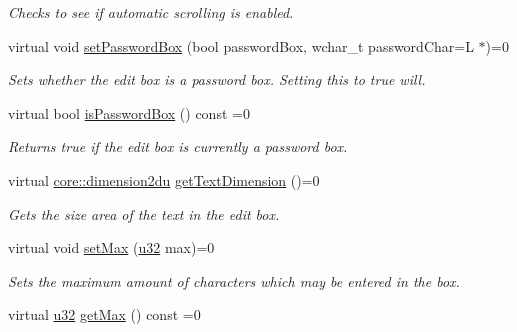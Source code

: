 \begin{DoxyCompactItemize}
\begin{DoxyCompactList}\small\item\em Checks to see if automatic scrolling is enabled. \end{DoxyCompactList}\item 
virtual void \hyperlink{classirr_1_1gui_1_1IGUIEditBox_a755baeca9941267fe11b0c0598b772bf}{set\+Password\+Box} (bool password\+Box, wchar\+\_\+t password\+Char=L\textquotesingle{} $\ast$\textquotesingle{})=0
\begin{DoxyCompactList}\small\item\em Sets whether the edit box is a password box. Setting this to true will. \end{DoxyCompactList}\item 
\mbox{\label{classirr_1_1gui_1_1IGUIEditBox_a94b093df77af7cf3e3f9853d68d2c8f2}} 
virtual bool \hyperlink{classirr_1_1gui_1_1IGUIEditBox_a94b093df77af7cf3e3f9853d68d2c8f2}{is\+Password\+Box} () const =0
\begin{DoxyCompactList}\small\item\em Returns true if the edit box is currently a password box. \end{DoxyCompactList}\item 
virtual \hyperlink{namespaceirr_1_1core_a13e5bd7e47b2014eefc870ede11bbbbc}{core\+::dimension2du} \hyperlink{classirr_1_1gui_1_1IGUIEditBox_ac993c4647168460c68d56527ba213b9c}{get\+Text\+Dimension} ()=0
\begin{DoxyCompactList}\small\item\em Gets the size area of the text in the edit box. \end{DoxyCompactList}\item 
virtual void \hyperlink{classirr_1_1gui_1_1IGUIEditBox_a5253ed6b422e129356e56f8e2a610be5}{set\+Max} (\hyperlink{namespaceirr_a0416a53257075833e7002efd0a18e804}{u32} max)=0
\begin{DoxyCompactList}\small\item\em Sets the maximum amount of characters which may be entered in the box. \end{DoxyCompactList}\item 
\mbox{\label{classirr_1_1gui_1_1IGUIEditBox_ad402bf1211f1a41bf230cc587060648e}} 
virtual \hyperlink{namespaceirr_a0416a53257075833e7002efd0a18e804}{u32} \hyperlink{classirr_1_1gui_1_1IGUIEditBox_ad402bf1211f1a41bf230cc587060648e}{get\+Max} () const =0

\end{DoxyCompactItemize}
